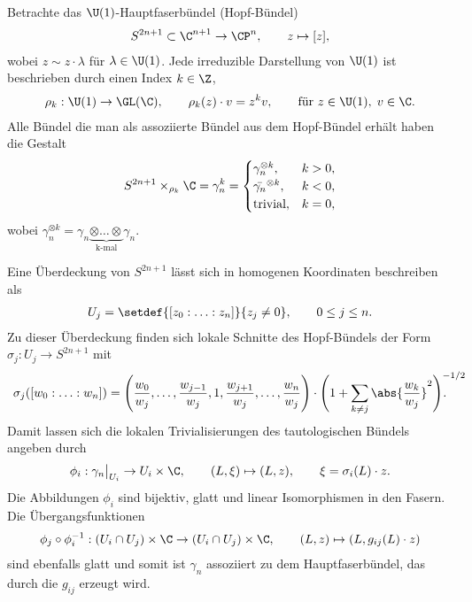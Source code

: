 \documentclass[%
	paper=a5,%
	fleqn,%
	DIV=18,%
	BCOR=0mm,
	fontsize=11pt,
	titlepage=false,%
	bibliography=totoc,
	DIV=18,%
	twoside=true,
	pdftitle=Riemannsche Geometrie,
	pdfauthor=Uwe Semmelmann,
	numbers=noendperiod]%
	{scrbook}
\begin{document}
\begin{ex}
\begin{exenum}
Betrachte das $\U(1)$-Hauptfaserbündel (Hopf-Bündel)
\begin{align*}
S^{2n+1}\subset \C^{n+1} \to \CP^n,\qquad z\mapsto [z],
\end{align*}
wobei $z \sim z\cdot \lambda$ für $\lambda\in \U(1)$. Jede irreduzible
Darstellung von $\U(1)$ ist beschrieben durch einen Index $k\in\Z$,
\begin{align*}
\rho_k : \U(1)\to \GL(\C),\qquad \rho_k(z)\cdot v = z^kv,\qquad
\text{für }z\in\U(1),\; v\in \C.
\end{align*}
Alle Bündel die man als assoziierte Bündel aus dem Hopf-Bündel erhält haben die
Gestalt
\begin{align*}
S^{2n+1}\times_{\rho_k}\C = \gamma_n^k =
\begin{cases}
\gamma_n^{\otimes k}, & k > 0,\\
\bar{\gamma_n}^{\otimes k}, & k < 0,\\
\text{trivial}, & k=0,
\end{cases}
\end{align*}
wobei $\gamma_n^{\otimes k} = \gamma_n \underbrace{\otimes \ldots
\otimes}_{\text{k-mal}} \gamma_n$.

Eine Überdeckung von $S^{2n+1}$ lässt sich in homogenen Koordinaten beschreiben
als
\begin{align*}
U_j = \setdef{[z_0:\ldots:z_n]}{z_j\neq 0},\qquad 0\le j \le n.
\end{align*}
Zu dieser Überdeckung finden sich lokale Schnitte des Hopf-Bündels der
Form $\sigma_j : U_j \to S^{2n+1}$ mit
\begin{align*}
\sigma_j([w_0:\ldots:w_n]) =
\Biggl(\frac{w_0}{w_j},\ldots,
\frac{w_{j-1}}{w_j},1,\frac{w_{j+1}}{w_j},\ldots,\frac{w_n}{w_j}
\Biggr)\cdot\Biggl(1 + \sum_{k\neq j}
\abs{\frac{w_k}{w_j}}^2\Biggr)^{-1/2}\!\!\!\!\!\!\!\!\!\!\!.
\end{align*}
Damit lassen sich die lokalen Trivialisierungen des tautologischen Bündels
angeben durch
\begin{align*}
\phi_i: \gamma_n\big|_{U_i} \to U_i\times \C,\qquad (L,\xi) \mapsto (L,z),\qquad
\xi = \sigma_i(L)\cdot z.
\end{align*}
Die Abbildungen $\phi_i$ sind bijektiv, glatt und linear Isomorphismen in den
Fasern. Die Übergangsfunktionen
\begin{align*}
\phi_j\circ\phi_i^{-1}: (U_i\cap U_j)\times\C\to (U_i\cap U_j)\times\C,\qquad
(L,z) \mapsto (L,g_{ij}(L)\cdot z)
\end{align*}
sind ebenfalls glatt und somit ist $\gamma_n$ assoziiert zu dem
Hauptfaserbündel, das durch die $g_{ij}$ erzeugt wird.\boxc
\end{exenum}

\end{ex}
\end{document}
